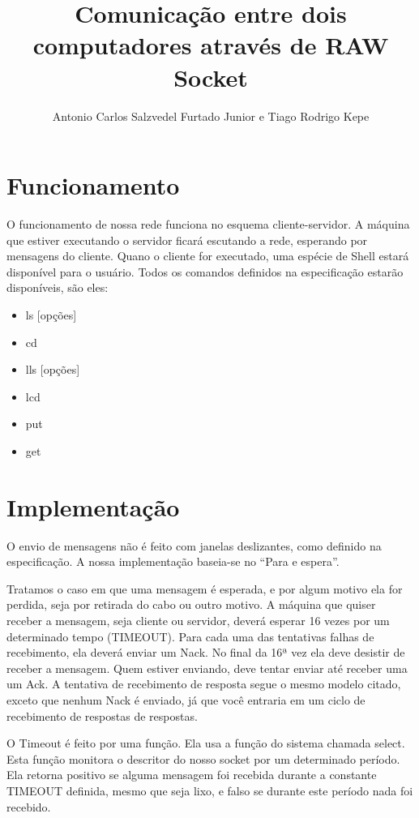 \documentclass[a4paper,10pt]{coursepaper}
\title{Comunicação entre dois computadores através de RAW Socket}
\author{Antonio Carlos Salzvedel Furtado Junior e Tiago Rodrigo Kepe}
\begin{document}
\maketitle

\section{Funcionamento}

O funcionamento de nossa rede funciona no esquema cliente-servidor. A máquina que estiver executando o servidor ficará escutando a rede,  esperando por mensagens do cliente. Quano o cliente for executado, uma espécie de Shell estará disponível para o usuário. Todos os comandos definidos na especificação estarão disponíveis, são eles:
\begin{itemize}
 \item ls [opções]
 \item cd
 \item lls [opções]
 \item lcd
 \item put
 \item get
\end{itemize}


\section{Implementação}

O envio de mensagens não é feito com janelas deslizantes, como definido na especificação. A nossa implementação baseia-se no ``Para e espera''. 

Tratamos o caso em que uma mensagem é esperada, e por algum motivo ela for perdida, seja por retirada do cabo ou outro motivo. A máquina que quiser receber a mensagem, seja cliente ou servidor, deverá esperar 16 vezes por um determinado tempo (TIMEOUT). Para cada uma das tentativas falhas de recebimento, ela deverá enviar um Nack. No final da 16ª vez ela deve desistir de receber a mensagem.
Quem estiver enviando, deve tentar enviar até receber uma um Ack. A tentativa de recebimento de resposta segue o mesmo modelo citado, exceto que nenhum Nack é enviado, já que você entraria em um ciclo de recebimento de respostas de respostas.


O Timeout é feito por uma função. Ela usa a função do sistema chamada select. Esta função monitora o descritor do nosso socket por um determinado período. Ela retorna positivo se alguma mensagem foi recebida durante a constante TIMEOUT definida, mesmo que seja lixo, e falso se durante este período nada foi recebido.
\end{document}
